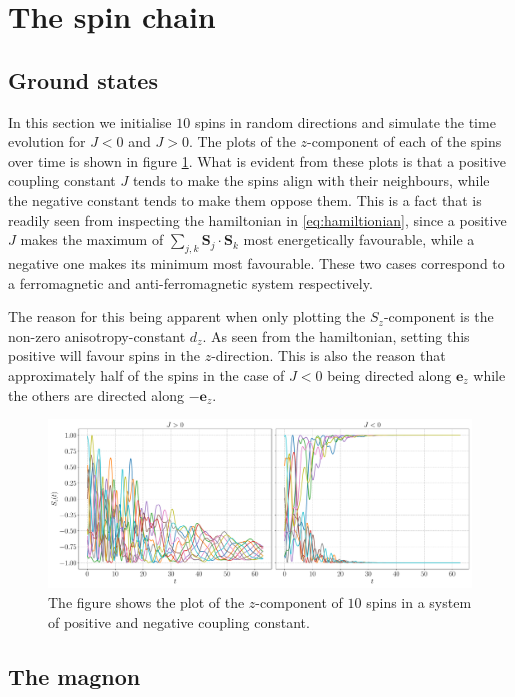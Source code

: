 \section{The spin chain}

\subsection{Ground states}\label{sec:groundstates}

In this section we initialise $10$ spins in random directions and simulate the time evolution for $J <0$ and $J>0$. The plots of the $z$-component of each of the spins over time is shown in figure \ref{fig:gs}. What is evident from these plots is that a positive coupling constant $J$ tends to make the spins align with their neighbours, while the negative constant tends to make them oppose them. This is a fact that is readily seen from inspecting the hamiltonian in \eqref{eq:hamiltionian}, since a positive $J$ makes the maximum of $\sum_{j,k} \mathbf{S}_j \cdot \mathbf{S}_k$ most energetically favourable, while a negative one makes its minimum most favourable. These two cases correspond to a ferromagnetic and anti-ferromagnetic system respectively.

The reason for this being apparent when only plotting the $S_z$-component is the non-zero anisotropy-constant $d_z$. As seen from the hamiltonian, setting this positive will favour spins in the $z$-direction. This is also the reason that approximately half of the spins in the case of $J<0$ being directed along $\mathbf{e}_z$ while the others are directed along $-\mathbf{e}_z$.

\begin{figure}[htb]
	\centering
	\includegraphics[width=\columnwidth]{../fig/gs.pdf}
	\caption{The figure shows the plot of the $z$-component of $10$ spins in a system of positive and negative coupling constant.}
	\label{fig:gs}
\end{figure}

\subsection{The magnon}

